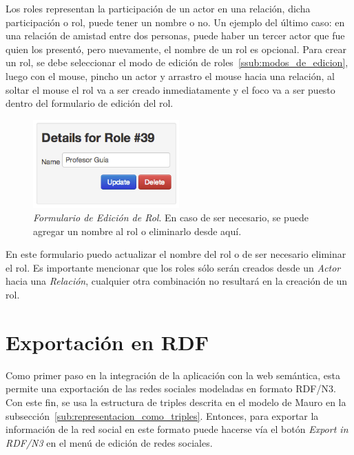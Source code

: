 Los roles representan la participación de un actor en una relación, dicha participación o rol, puede tener un nombre o no. Un ejemplo del último caso: en una relación de amistad entre dos personas, puede haber un tercer actor que fue quien los presentó, pero nuevamente, el nombre de un rol es opcional. Para crear un rol, se debe seleccionar el modo de edición de roles~\ref{ssub:modos_de_edicion}, luego con el mouse, pincho un actor y arrastro el mouse hacia una relación, al soltar el mouse el rol va a ser creado inmediatamente y el foco va a ser puesto dentro del formulario de edición del rol.

\begin{figure}[H]
  \centering
  \includegraphics[width=0.5\textwidth]{images/edicion_rol.png}
  \caption[Formulario de Edición de Rol]{\emph{Formulario de Edición de Rol}. En caso de ser necesario, se puede agregar un nombre al rol o eliminarlo desde aquí.}
  \label{edicion_rol}
\end{figure}

En este formulario puedo actualizar el nombre del rol o de ser necesario eliminar el rol. Es importante mencionar que los roles sólo serán creados desde un \emph{Actor} hacia una \emph{Relación}, cualquier otra combinación no resultará en la creación de un rol.



\section{Exportación en RDF} %
\label{sec:exportacion_en_rdf}

Como primer paso en la integración de la aplicación con la web semántica, esta permite una exportación de las redes sociales modeladas en formato RDF/N3. Con este fin, se usa la estructura de triples descrita en el modelo de Mauro en la subsección~\ref{sub:representacion_como_triples}. Entonces, para exportar la información de la red social en este formato puede hacerse vía el botón \emph{Export in RDF/N3} en el menú de edición de redes sociales.\\

